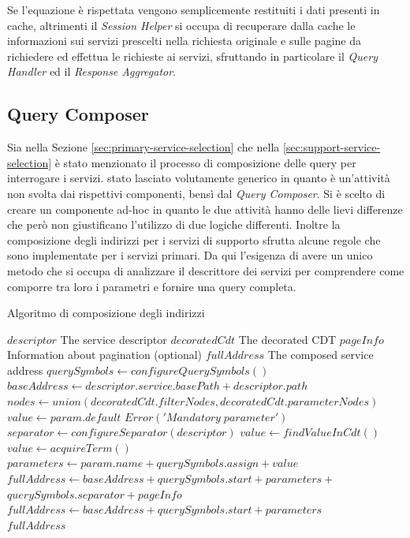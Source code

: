 Se l'equazione è rispettata vengono semplicemente restituiti i dati presenti in cache, altrimenti il \emph{Session Helper} si occupa di recuperare dalla cache le informazioni sui servizi prescelti nella richiesta originale e sulle pagine da richiedere ed effettua le richieste ai servizi, sfruttando in particolare il \emph{Query Handler} ed il \emph{Response Aggregator}.

\subsection{Query Composer\label{sec:query-composer}}

Sia nella Sezione \ref{sec:primary-service-selection} che nella \ref{sec:support-service-selection} è stato menzionato il processo di composizione delle query per interrogare i servizi. \upe stato lasciato volutamente generico in quanto è un'attività non svolta dai rispettivi componenti, bensì dal \emph{Query Composer}. Si è scelto di creare un componente ad-hoc in quanto le due attività hanno delle lievi differenze che però non giustificano l'utilizzo di due logiche differenti. Inoltre la composizione degli indirizzi per i servizi di supporto sfrutta alcune regole che sono implementate per i servizi primari. Da qui l'esigenza di avere un unico metodo che si occupa di analizzare il descrittore dei servizi per comprendere come comporre tra loro i parametri e fornire una query completa.

\begin{algorithm}
	\caption{Algoritmo di composizione degli indirizzi}
	\label{alg:algoritmo-composizione-indirizzi}
	\begin{algorithmic}
		\Require
			\Statex $ descriptor $ \Comment The service descriptor
			\Statex $ decoratedCdt $ \Comment The decorated CDT
			\Statex $ pageInfo $ \Comment Information about pagination  (optional)
		\Ensure
			\Statex $ fullAddress $ \Comment The composed service address
		\Statex
		\State $ querySymbols \gets configureQuerySymbols() $
		\State $ baseAddress \gets descriptor.service.basePath + descriptor.path $
		\State $ nodes \gets union(decoratedCdt.filterNodes, decoratedCdt.parameterNodes) $
					\State $ value \gets  param.default  $
				\Else
						\State $ Error('Mandatory\; parameter') $
					\EndIf
				\EndIf
			\Else
				\State $ separator \gets configureSeparator(descriptor) $
					\State $ value \gets findValueInCdt() $
				\Else
					\State $ value \gets acquireTerm() $
				\EndIf
			\EndIf
			\State $ parameters \gets param.name + querySymbols.assign + value  $
		\EndFor
			\State $ fullAddress \gets baseAddress + querySymbols.start + parameters +$
			\State\hspace{\algorithmicindent} $ querySymbols.separator + pageInfo $
		\Else
			\State $ fullAddress \gets baseAddress + querySymbols.start + parameters$
		\EndIf\\
		\Return $ fullAddress $
	\end{algorithmic}
\end{algorithm}

